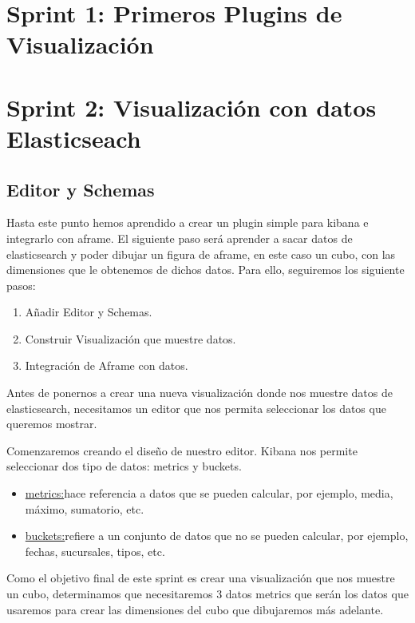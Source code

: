 \documentclass[a4paper, 12pt]{book}
\begin{document}

\section{Sprint 1: Primeros Plugins de Visualización }
\label{sec:sprint1}


\section{Sprint 2: Visualización con datos Elasticseach }
\label{sec:sprint2}
\subsection{Editor y Schemas}
Hasta este punto hemos aprendido a crear un plugin simple para kibana e integrarlo con aframe. El siguiente paso será aprender a sacar datos de elasticsearch y poder dibujar un figura de aframe, en este caso un cubo, con las dimensiones que le obtenemos de dichos datos. Para ello, seguiremos los siguiente pasos:
\begin{enumerate}
    \item Añadir Editor y Schemas.
    \item Construir Visualización que muestre datos.
    \item Integración de Aframe con datos.
\end{enumerate}

Antes de ponernos a crear una nueva visualización donde nos muestre datos de elasticsearch, necesitamos un editor que nos permita seleccionar los datos que queremos mostrar. 

Comenzaremos creando el diseño de nuestro editor. Kibana nos permite seleccionar dos tipo de datos: metrics y buckets.
\begin{itemize}
    \item \underline{metrics:}hace referencia a datos que se pueden calcular, por ejemplo, media, máximo, sumatorio, etc.
    \item \underline{buckets:}refiere a un conjunto de datos que no se pueden calcular, por ejemplo, fechas, sucursales, tipos, etc.
\end{itemize}

Como el objetivo final de este sprint es crear una visualización que nos muestre un cubo, determinamos que necesitaremos 3 datos metrics que serán los datos que usaremos para crear las dimensiones del cubo que dibujaremos más adelante.
\end{document}
